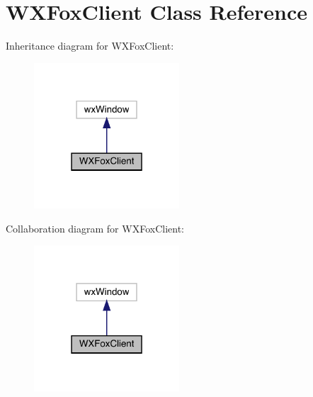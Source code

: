 \hypertarget{class_w_x_fox_client}{}\section{W\+X\+Fox\+Client Class Reference}
\label{class_w_x_fox_client}


Inheritance diagram for W\+X\+Fox\+Client\+:
\nopagebreak
\begin{figure}[H]
\begin{center}
\leavevmode
\includegraphics[width=154pt]{class_w_x_fox_client__inherit__graph}
\end{center}
\end{figure}


Collaboration diagram for W\+X\+Fox\+Client\+:
\nopagebreak
\begin{figure}[H]
\begin{center}
\leavevmode
\includegraphics[width=154pt]{class_w_x_fox_client__coll__graph}
\end{center}
\end{figure}
